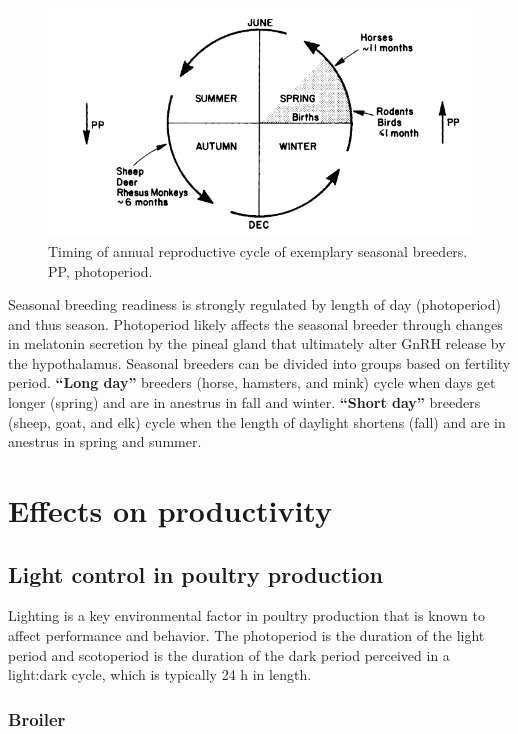 \documentclass[]{book}
\begin{document}
\begin{figure}

{\centering \includegraphics[width=0.7\linewidth]{figures/seasonal-breed} 

}

\caption{Timing of annual reproductive cycle of exemplary seasonal breeders. PP, photoperiod. }\label{fig:seaonal-breed}
\end{figure}

Seasonal breeding readiness is strongly regulated by length of day
(photoperiod) and thus season. Photoperiod likely affects the seasonal
breeder through changes in melatonin secretion by the pineal gland that
ultimately alter GnRH release by the hypothalamus. Seasonal breeders can
be divided into groups based on fertility period. \textbf{``Long day''}
breeders (horse, hamsters, and mink) cycle when days get longer (spring)
and are in anestrus in fall and winter. \textbf{``Short day''} breeders
(sheep, goat, and elk) cycle when the length of daylight shortens (fall)
and are in anestrus in spring and summer.

\section{Effects on productivity}\label{effects-on-productivity}

\subsection{Light control in poultry
production}\label{light-control-in-poultry-production}

Lighting is a key environmental factor in poultry production that is
known to affect performance and behavior. The photoperiod is the
duration of the light period and scotoperiod is the duration of the dark
period perceived in a light:dark cycle, which is typically 24 h in
length.

\subsubsection{Broiler}\label{broiler}
\end{document}
